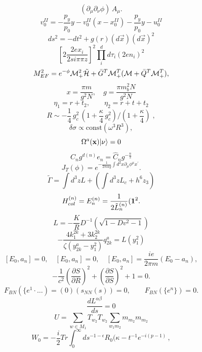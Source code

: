 \documentclass{article}
\begin{document}
$$( \partial _ { \mu } \partial _ { \nu } \phi ) \, A _ { \mu } .$$
$$v _ { 0 } ^ { I I } = - \frac { p _ { y } } { p _ { 0 } } y - v _ { 0 } ^ { I I } ( x - x _ { 0 } ^ { I I } ) - \frac { p _ { y } } { p _ { 0 } } y - u _ { 0 } ^ { I I }$$
$$d s ^ { 2 } = - d t ^ { 2 } + g ( r ) ( d \vec { x } ) ( d \vec { x } ) ^ { 2 }$$
$$\left [ 2 { \frac { 2 e x _ { i } } { 2 s i \pi \pi z } } \right ] ^ { 2 } \prod _ { i } ^ { d } d \tau _ { i } \left ( 2 e n _ { i } \right ) ^ { 2 }$$
$$M _ { E F } ^ { 2 } = e ^ { - \phi } { \cal M } _ { + } ^ { 2 } \tilde { \cal H } + { \bar { G } } ^ { T } { \cal M } _ { + } ^ { T } ( { \cal M } + { \bar { Q } } ^ { T } { \cal M } _ { + } ^ { T } ) ,$$
$$x = \frac { \pi m } { g ^ { 2 } N } , \quad g = \frac { \pi m _ { b } ^ { 2 } N } { g ^ { 2 } N }$$
$$\eta _ { 1 } = r + t _ { 2 } , \qquad \eta _ { 2 } = r + t + t _ { 2 }$$
$$R \sim - \frac { 1 } { 4 } \, g _ { c } ^ { 2 } \, ( 1 + \frac { \kappa } { 4 } \, g _ { c } ^ { 2 } ) / ( 1 + \frac { \kappa } { 4 } ) \; ,$$
$$\delta \sigma \propto \mathrm { c o n s t } ( \omega ^ { 3 } R ^ { 3 } ) ,$$
$$\Omega ^ { a } ( { \bf { x } } ) | \nu \rangle = 0$$
$$C _ { n } g ^ { d ( n ) } e _ { n } = \hat { C } _ { n } g ^ { - \frac { n } { 2 } }$$
$$J _ { T } ( \phi ) = e ^ { - \frac { 1 } { 2 \pi i a g } \int d ^ { 2 } x \partial _ { \mu } \phi ^ { \mu } x ^ { \prime } } .$$
$$\tilde { \Gamma } = \int d ^ { 3 } z L + ( \int d ^ { 3 } z L _ { c } + h ^ { 6 } z _ { 3 } )$$
$$H _ { c o l } ^ { ( n ) } = E _ { n } ^ { ( n ) } = \frac { 1 } { 2 \tilde { L } _ { n } ^ { ( n ) } } ( { \bf 1 } ^ { 2 } .$$
$$L = - \frac { K } { R } D ^ { - 1 } ( \sqrt { 1 - D v ^ { 2 } - 1 } )$$
$$- \frac { 4 k _ { 1 } ^ { 2 k } + 3 k _ { 2 } ^ { 2 k } } { \zeta ( y _ { 2 k } ^ { a } - y _ { 1 } ^ { 2 } ) } q _ { 2 k } ^ { a } = L ( y _ { 1 } ^ { 2 } )$$
$$[ E _ { 0 } , a _ { n } ] = 0 , \quad [ E _ { 0 } , a _ { n } ] = 0 , \quad [ E _ { 0 } , a _ { n } ] = \frac { i e } { 2 \pi m } \left ( E _ { 0 } - a _ { n } \right ) ,$$
$$- \frac { 1 } { c ^ { 2 } } \left ( \frac { \partial S } { \partial R } \right ) ^ { 2 } + \left ( \frac { \partial S } { \partial S } \right ) ^ { 2 } + 1 = 0 .$$
$$F _ { B N } ( \{ e ^ { 1 } \cdot \ldots ) = ( 0 ) ( s _ { N N } ( s ) ) = 0 , \qquad F _ { B N } ( \{ e ^ { n } \} ) = 0 .$$
$$\frac { d L ^ { \alpha \beta } } { d s } = 0$$
$$U = \sum _ { w \in M _ { 1 } } T _ { w _ { 2 } } T _ { w _ { 2 } } \sum _ { w _ { 1 } m _ { 2 } } m _ { m _ { 2 } } m _ { m _ { 2 } }$$
$$W _ { 0 } = - \frac { i } { 2 } T r \int _ { 0 } ^ { \infty } d s ^ { - 1 - \epsilon } R _ { 0 } ( \kappa - t ^ { - 1 } e ^ { - i ( p - 1 ) } \, ,$$
\end{document}
